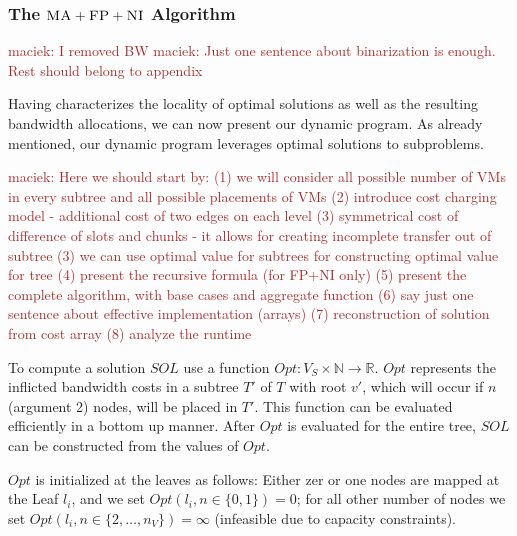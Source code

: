 \documentclass[9pt,twocolumn]{scrartcl}
\newcommand{\maciek}[1]{\textcolor{brown}{maciek: #1}}
\newcommand{\ChunkLocation}{\pi}
\newcommand{\SubstrateNodes}{\ensuremath{V_S}}
\newcommand{\SubstrateNode}{\ensuremath{v}}
\newcommand{\Leaf}{\ensuremath{l}}
\newcommand{\Leaves}{\ensuremath{L}}
\newcommand{\Chunks}{\ensuremath{\textsc{chunks}}}
\newcommand{\Opt}{\ensuremath{Opt}}
\newcommand{\Children}{\ensuremath{children}}
\newcommand{\ChunkCount}{\ensuremath{\textsc{cis}}}
\newcommand{\achunk}{\ensuremath{c}}
\newcommand{\CC}{\textsc{NI}}
\newcommand{\FP}{\textsc{FP}}
\newcommand{\MA}{\textsc{MA}}
\newcommand{\Bandwidth}{\ensuremath{bw}}
\newcommand{\Tree}{\ensuremath{T}}
\newcommand{\Vms}{\ensuremath{n_V}}
\newcommand{\Sol}{\ensuremath{SOL}}
\begin{document}
\begin{appendix}
\subsubsection{The $\MA+\FP+\CC$ Algorithm}

\maciek{I removed BW}
\maciek{Just one sentence about binarization is enough. Rest should belong to appendix}

Having characterizes the locality of optimal solutions as well as the resulting
bandwidth allocations, we can now present our dynamic program.
As already mentioned, our dynamic program leverages optimal solutions to
subproblems.

\maciek{Here we should start by: (1) we will consider all possible number of VMs in every subtree and all possible placements of VMs
  (2) introduce cost charging model - additional cost of two edges on each level (3) symmetrical cost of difference of slots and chunks - it allows for creating incomplete transfer out of subtree (3) we can use optimal value for subtrees for constructing optimal value for tree (4) present the recursive formula (for FP+NI only) (5) present the complete algorithm, with base cases and aggregate function (6) say just one sentence about effective implementation (arrays) (7) reconstruction of solution from cost array (8) analyze the runtime}

To compute a solution $\Sol$ use a
function $\Opt : \SubstrateNodes \times \mathbb{N} \rightarrow \mathbb{R}$.
$\Opt$ represents the inflicted bandwidth costs in a subtree $\Tree'$ of $\Tree$
with root $\SubstrateNode'$, which will occur if $n$ (argument 2)
nodes, will be placed in $\Tree'$.
This
function can be evaluated
efficiently in a bottom up manner. After $\Opt$ is evaluated for the entire
tree, $\Sol$ can be constructed from the values of $\Opt$.

$\Opt$ is initialized at the leaves as follows:
Either zer or one nodes are mapped at the Leaf $\Leaf_i$,
and we set $\Opt(\Leaf_i, n \in
\{0,1\}) = 0$; for all other number of nodes we set $\Opt(\Leaf_i, n \in
\{2,\dots,\Vms\}) = \infty$ (infeasible due to capacity constraints).


\end{appendix}
\end{document}
